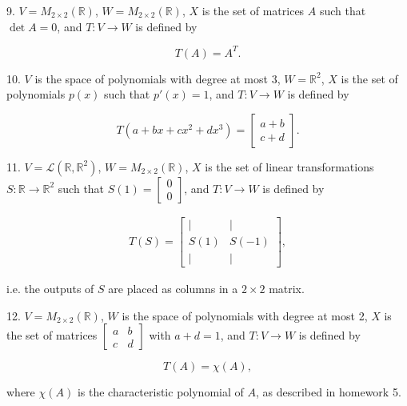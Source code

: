 \documentclass{article}
\begin{document}
9. $V = M_{2 \times 2}(\mathbb{R})$, $W = M_{2 \times 2}(\mathbb{R})$, $X$ is the set of matrices $A$ such that $\det A = 0$, and $T : V \to W$ is defined by

$$
	T(A) = A^T.
$$

10. $V$ is the space of polynomials with degree at most 3, $W = \mathbb{R}^2$, $X$ is the set of polynomials $p(x)$ such that $p'(x) = 1$, and $T : V \to W$ is defined by

$$
	T(a + bx + cx^2 + dx^3) = \left[\begin{array}{c} a + b \\ c + d \end{array}\right].
$$

11. $V = \mathcal{L}(\mathbb{R}, \mathbb{R}^2)$, $W = M_{2 \times 2}(\mathbb{R})$, $X$ is the set of linear transformations $S : \mathbb{R} \to \mathbb{R}^2$ such that $S(1) = \left[\begin{array}{c} 0 \\ 0 \end{array}\right]$, and $T : V \to W$ is defined by

\begin{align*}
	T(S) = \left[\begin{array}{cc} \mid& \mid \\ S(1)& S(-1) \\ \mid& \mid \end{array}\right],
\end{align*}

i.e. the outputs of $S$ are placed as columns in a $2 \times 2$ matrix.

12. $V = M_{2 \times 2}(\mathbb{R})$, $W$ is the space of polynomials with degree at most 2, $X$ is the set of matrices $\left[\begin{array}{cc} a& b \\ c& d \end{array}\right]$ with $a + d = 1$, and $T : V \to W$ is defined by

$$
	T(A) = \chi(A),
$$

where $\chi(A)$ is the characteristic polynomial of $A$, as described in homework 5.
\end{document}
